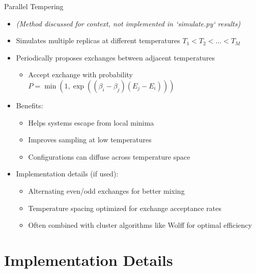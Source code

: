 \documentclass[11pt,aspectratio=169]{beamer}
\begin{document}
\begin{frame}{Parallel Tempering}
    \begin{itemize}
        \item \textit{(Method discussed for context, not implemented in `simulate.py` results)}
        \item Simulates multiple replicas at different temperatures $T_1 < T_2 < ... < T_M$
        \item Periodically proposes exchanges between adjacent temperatures
        \begin{itemize}
            \item Accept exchange with probability $P = \min(1, \exp((\beta_i - \beta_j)(E_j - E_i)))$
        \end{itemize}
        \pause
        \item Benefits:
        \begin{itemize}
            \item Helps systems escape from local minima
            \item Improves sampling at low temperatures
            \item Configurations can diffuse across temperature space
        \end{itemize}
        \pause
        \item Implementation details (if used):
        \begin{itemize}
            \item Alternating even/odd exchanges for better mixing
            \item Temperature spacing optimized for exchange acceptance rates
            \item Often combined with cluster algorithms like Wolff for optimal efficiency
        \end{itemize}
    \end{itemize}
\end{frame}

\section{Implementation Details}
\end{document}
